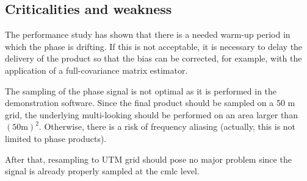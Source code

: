 \subsection{Criticalities and weakness}
\label{sec:cmlc_criticalities}

The performance study has shown that there is a needed warm-up period in which the phase is drifting. If this is not acceptable, it is necessary to delay the delivery of the product so that the bias can be corrected, for example, with the application of a full-covariance matrix estimator.

The sampling of the phase signal is not optimal as it is performed in the demonstration software. Since the final product should be sampled on a 50 m grid, the underlying multi-looking should be performed on an area larger than $(50 \mathrm{m})^2$. Otherwise, there is a risk of frequency aliasing (actually, this is not limited to phase products).

After that, resampling to UTM grid should pose no major problem since the signal is already properly sampled at the \acs{cmlc} level.